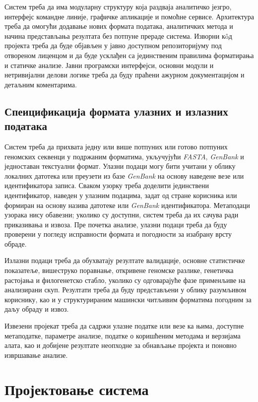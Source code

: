 \documentclass[12pt,oneside]{memoir}
\begin{document}
Систем треба да има модуларну структуру која раздваја аналитичко језгро, интерфејс командне линије, графичке апликације и помоћне сервисе. Архитектура треба да омогући додавање нових формата података, аналитичких метода и начина представљања резултата без потпуне прераде система. Изворни кôд пројекта треба да буде објављен у јавно доступном репозиторијуму под отвореном лиценцом и да буде усклађен са јединственим правилима форматирања и статичке анализе. Јавни програмски интерфејси, основни модули и нетривијални делови логике треба да буду праћени ажурном документацијом и детаљним коментарима.


\subsection{Спеицификација формата улазних и излазних података}
Систем треба да прихвата једну или више потпуних или готово потпуних геномских секвенци у подржаним форматима, укључујући \textit{FASTA}, \textit{GenBank} и једноставан текстуални формат. Улазни подаци могу бити учитани у облику локалних датотека или преузети из базе \textit{GenBank} на основу наведене везе или идентификатора записа. Сваком узорку треба доделити јединствени идентификатор, наведен у улазним подацима, задат од стране корисника или формиран на основу назива датотеке или \textit{GenBank} идентификатора. Метаподаци узорака нису обавезни; уколико су доступни, систем треба да их сачува ради приказивања и извоза. Пре почетка анализе, улазни подаци треба да буду проверени у погледу исправности формата и погодности за изабрану врсту обраде.

Излазни подаци треба да обухватају резултате валидације, основне статистичке показатеље, вишеструко поравнање, откривене геномске разлике, генетичка растојања и филогенетско стабло, уколико су одговарајуће фазе применљиве на анализирани скуп. Резултати треба да буду представљени у облику разумљивом кориснику, као и у структурираним машински читљивим форматима погодним за даљу обраду и извоз.

Извезени пројекат треба да садржи улазне податке или везе ка њима, доступне метаподатке, параметре анализе, податке о коришћеним методама и верзијама алата, као и добијене резултате неопходне за обнављање пројекта и поновно извршавање анализе.
\setcounter{secnumdepth}{1}

\section{Пројектовање система}
\end{document}
